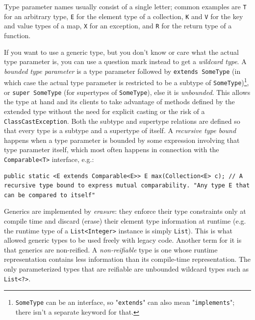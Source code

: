 \documentclass[table, xcdraw]{article}%
\begin{document}
Type parameter names usually consist of a single letter; common examples are \texttt{T} for an arbitrary type, \texttt{E} for the element type of a collection, \texttt{K} and \texttt{V} for the key and value types of a map, \texttt{X} for an exception, and \texttt{R} for the return type of a function.

If you want to use a generic type, but you don't know or care what the actual type parameter is, you can use a question mark instead to get a \emph{wildcard type}. A \emph{bounded type parameter} is a type parameter followed by \texttt{extends SomeType} (in which case the actual type parameter is restricted to be a subtype of \texttt{SomeType})\footnote{\texttt{SomeType} can be an interface, so "\texttt{extends}" can also mean "\texttt{implements}"; there isn't a separate keyword for that.}, or \texttt{super SomeType} (for supertypes of \texttt{SomeType}), else it is \emph{unbounded}. This allows the type at hand and its clients to take advantage of methods defined by the extended type without the need for explicit casting or the risk of a \texttt{ClassCastException}. Both the subtype and supertype relations are defined so that every type is a subtype and a supertype of itself. A \emph{recursive type bound} happens when a type parameter is bounded by some expression involving that type parameter itself, which most often happens in connection with the \texttt{Comparable<T>} interface, e.g.:

\begin{verbatim}
public static <E extends Comparable<E>> E max(Collection<E> c); // A recursive type bound to express mutual comparability. "Any type E that can be compared to itself"
\end{verbatim}

Generics are implemented by \emph{erasure}: they enforce their type constraints only at compile time and discard (erase) their element type information at runtime (e.g. the runtime type of a \texttt{List<Integer>} instance is simply \texttt{List}). This is what allowed generic types to be used freely with legacy code. Another term for it is that generics are non-reified. A \emph{non-reifiable} type is one whose runtime representation contains less information than its compile-time representation. The only parameterized types that are reifiable are unbounded wildcard types such as \texttt{List<?>}.
\end{document}

